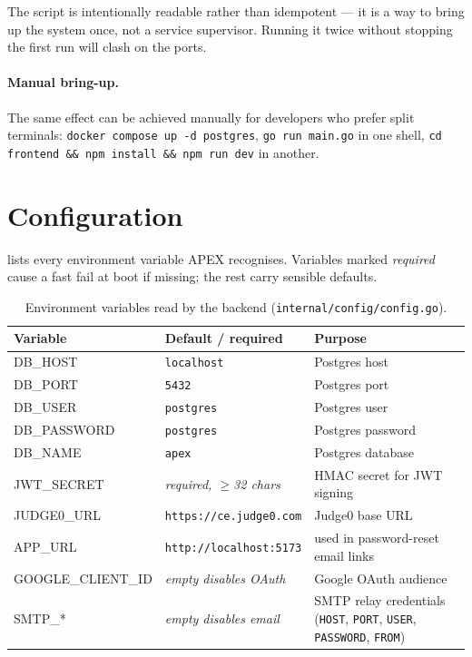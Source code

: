 The script is intentionally readable rather than idempotent --- it is a way to bring up the system once, not a service supervisor. Running it twice without stopping the first run will clash on the ports.

\paragraph{Manual bring-up.} The same effect can be achieved manually for developers who prefer split terminals: \texttt{docker compose up -d postgres}, \texttt{go run main.go} in one shell, \texttt{cd frontend \&\& npm install \&\& npm run dev} in another.

\section{Configuration}

 lists every environment variable APEX recognises. Variables marked \emph{required} cause a fast fail at boot if missing; the rest carry sensible defaults.

\begin{table}[H]
  \centering
  \caption{Environment variables read by the backend (\texttt{internal/config/config.go}).}
  \label{tab:env}
  \small
  \begin{tabularx}{\linewidth}{>{\ttfamily}p{3.4cm} p{4.2cm} X}
    \toprule
    \normalfont Variable & Default / required & Purpose \\
    \midrule
    DB\_HOST             & \texttt{localhost}                 & Postgres host \\
    DB\_PORT             & \texttt{5432}                      & Postgres port \\
    DB\_USER             & \texttt{postgres}                  & Postgres user \\
    DB\_PASSWORD         & \texttt{postgres}                  & Postgres password \\
    DB\_NAME             & \texttt{apex}                      & Postgres database \\
    JWT\_SECRET          & \normalfont\emph{required, $\geq$32 chars} & HMAC secret for JWT signing \\
    JUDGE0\_URL          & \texttt{https://ce.judge0.com}     & Judge0 base URL \\
    APP\_URL             & \texttt{http://localhost:5173}     & used in password-reset email links \\
    GOOGLE\_CLIENT\_ID   & \normalfont\emph{empty disables OAuth} & Google OAuth audience \\
    SMTP\_*              & \normalfont\emph{empty disables email} & SMTP relay credentials (\texttt{HOST}, \texttt{PORT}, \texttt{USER}, \texttt{PASSWORD}, \texttt{FROM}) \\
    \bottomrule
  \end{tabularx}
\end{table}

